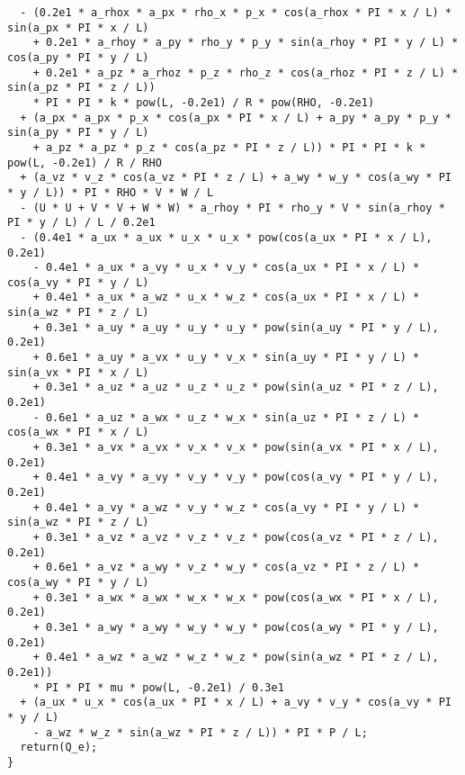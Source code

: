 \documentclass[10pt]{article}
\begin{document}
\begin{small}
\begin{verbatim}
  - (0.2e1 * a_rhox * a_px * rho_x * p_x * cos(a_rhox * PI * x / L) * sin(a_px * PI * x / L)
    + 0.2e1 * a_rhoy * a_py * rho_y * p_y * sin(a_rhoy * PI * y / L) * cos(a_py * PI * y / L)
    + 0.2e1 * a_pz * a_rhoz * p_z * rho_z * cos(a_rhoz * PI * z / L) * sin(a_pz * PI * z / L))
    * PI * PI * k * pow(L, -0.2e1) / R * pow(RHO, -0.2e1)
  + (a_px * a_px * p_x * cos(a_px * PI * x / L) + a_py * a_py * p_y * sin(a_py * PI * y / L)
    + a_pz * a_pz * p_z * cos(a_pz * PI * z / L)) * PI * PI * k * pow(L, -0.2e1) / R / RHO
  + (a_vz * v_z * cos(a_vz * PI * z / L) + a_wy * w_y * cos(a_wy * PI * y / L)) * PI * RHO * V * W / L
  - (U * U + V * V + W * W) * a_rhoy * PI * rho_y * V * sin(a_rhoy * PI * y / L) / L / 0.2e1
  - (0.4e1 * a_ux * a_ux * u_x * u_x * pow(cos(a_ux * PI * x / L), 0.2e1)
    - 0.4e1 * a_ux * a_vy * u_x * v_y * cos(a_ux * PI * x / L) * cos(a_vy * PI * y / L)
    + 0.4e1 * a_ux * a_wz * u_x * w_z * cos(a_ux * PI * x / L) * sin(a_wz * PI * z / L)
    + 0.3e1 * a_uy * a_uy * u_y * u_y * pow(sin(a_uy * PI * y / L), 0.2e1)
    + 0.6e1 * a_uy * a_vx * u_y * v_x * sin(a_uy * PI * y / L) * sin(a_vx * PI * x / L)
    + 0.3e1 * a_uz * a_uz * u_z * u_z * pow(sin(a_uz * PI * z / L), 0.2e1)
    - 0.6e1 * a_uz * a_wx * u_z * w_x * sin(a_uz * PI * z / L) * cos(a_wx * PI * x / L)
    + 0.3e1 * a_vx * a_vx * v_x * v_x * pow(sin(a_vx * PI * x / L), 0.2e1)
    + 0.4e1 * a_vy * a_vy * v_y * v_y * pow(cos(a_vy * PI * y / L), 0.2e1)
    + 0.4e1 * a_vy * a_wz * v_y * w_z * cos(a_vy * PI * y / L) * sin(a_wz * PI * z / L)
    + 0.3e1 * a_vz * a_vz * v_z * v_z * pow(cos(a_vz * PI * z / L), 0.2e1)
    + 0.6e1 * a_vz * a_wy * v_z * w_y * cos(a_vz * PI * z / L) * cos(a_wy * PI * y / L)
    + 0.3e1 * a_wx * a_wx * w_x * w_x * pow(cos(a_wx * PI * x / L), 0.2e1)
    + 0.3e1 * a_wy * a_wy * w_y * w_y * pow(cos(a_wy * PI * y / L), 0.2e1)
    + 0.4e1 * a_wz * a_wz * w_z * w_z * pow(sin(a_wz * PI * z / L), 0.2e1))
    * PI * PI * mu * pow(L, -0.2e1) / 0.3e1
  + (a_ux * u_x * cos(a_ux * PI * x / L) + a_vy * v_y * cos(a_vy * PI * y / L)
    - a_wz * w_z * sin(a_wz * PI * z / L)) * PI * P / L;
  return(Q_e);
}
\end{verbatim}
\end{small}
 

\end{document}
